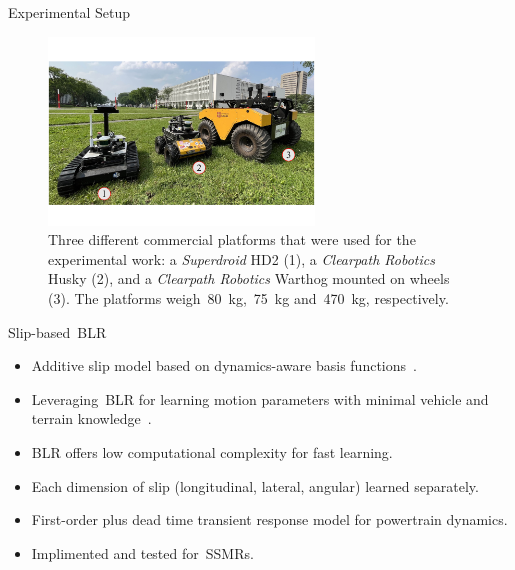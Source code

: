 \documentclass[final,hyperref={pdfpagelabels=false}]{beamer}
\begin{document}
\begin{frame}[t]
\begin{columns}[t]
\begin{column}{.465\textwidth}
\begin{block}{Experimental Setup}
	\begin{figure}%
		\begin{minipage}[b]{.32\textwidth}%
			\captionsetup{justification=justified, name=Figure 3}
			\caption{
				Three different commercial platforms that were used for the experimental work:
				a \emph{Superdroid} HD2 (1), a \emph{Clearpath Robotics} Husky (2), and a \emph{Clearpath Robotics} Warthog mounted
				on wheels (3). 
				The platforms weigh~\SI{80}{\kilo\gram},~\SI{75}{\kilo\gram} and~\SI{470}{\kilo\gram}, respectively.
			}
		\end{minipage}%
		\hskip10mm
		\includegraphics[width=0.63\textwidth]{./figures/norlab_robots_with_labels.pdf}
	\end{figure}
\end{block}


\begin{block}{Slip-based~\acf{BLR}}
	
	\begin{itemize}
		\item Additive slip model based on dynamics-aware basis functions~\cite{Seegmiller2014}.
		\item Leveraging~\acf{BLR} for learning motion parameters with minimal vehicle and terrain knowledge~\cite{McKinnon2019}.
		\item \ac{BLR} offers low computational complexity for fast learning.
		\item Each dimension of slip (longitudinal, lateral, angular) learned separately.
		\item First-order plus dead time transient response model for powertrain dynamics.
		\item Implimented and tested for~\acp{SSMR}.
	\end{itemize}
	

\end{block}
\end{column}
\end{columns}
\end{frame}
\end{document}
